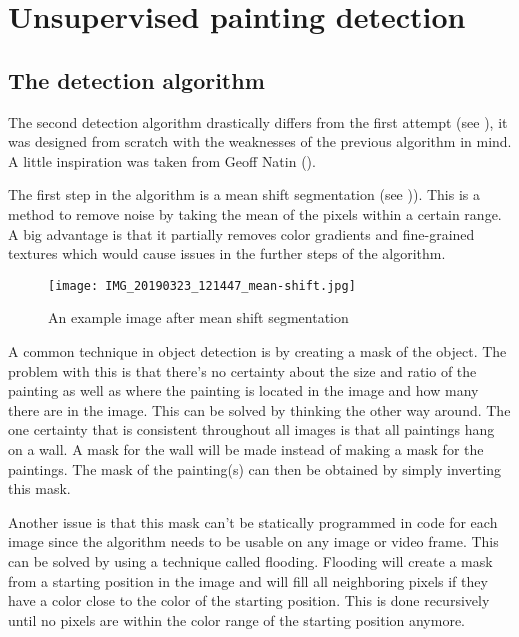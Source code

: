 \section{Unsupervised painting detection}
\label{sec:unsupervised_painting_detection}

\subsection{The detection algorithm}
\label{subsec:detection-algo}

The second detection algorithm drastically differs from the first attempt (see ), it was designed from scratch with the weaknesses of the previous algorithm in mind. A little inspiration was taken from Geoff Natin (\cite{natin2020}).

The first step in the algorithm is a mean shift segmentation (see )). This is a method to remove noise by taking the mean of the pixels within a certain range. A big advantage is that it partially removes color gradients and fine-grained textures which would cause issues in the further steps of the algorithm.

\begin{figure}[h]
    \texttt{[image: IMG\_20190323\_121447\_mean-shift.jpg]}
    \centering
    \caption{An example image after mean shift segmentation}
    \label{fig:paiting_detection_mean_shift}
\end{figure}

A common technique in object detection is by creating a mask of the object. The problem with this is that there's no certainty about the size and ratio of the painting as well as where the painting is located in the image and how many there are in the image. This can be solved by thinking the other way around. The one certainty that is consistent throughout all images is that all paintings hang on a wall. A mask for the wall will be made instead of making a mask for the paintings. The mask of the painting(s) can then be obtained by simply inverting this mask.

Another issue is that this mask can't be statically programmed in code for each image since the algorithm needs to be usable on any image or video frame. This can be solved by using a technique called flooding. Flooding will create a mask from a starting position in the image and will fill all neighboring  pixels if they have a color close to the color of the starting position. This is done recursively until no pixels are within the color range of the starting position anymore. \cite{he2019scan}

